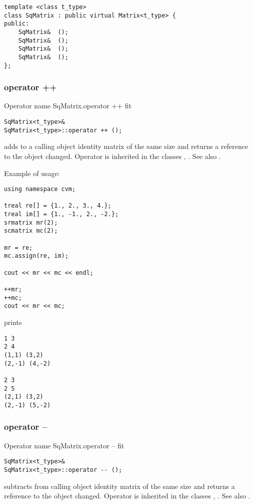 \bigskip
\noindent
\verb"template <class t_type>"\\
\verb"class SqMatrix : public virtual Matrix<t_type> {"\\
\verb"public:"\\
\verb"    SqMatrix& "\verb" ();"\\
\verb"    SqMatrix& "\verb" ();"\\
\verb"    SqMatrix& "\verb" ();"\\
\verb"    SqMatrix& "\verb" ();"\\
\verb"};"
\newpage




\subsubsection{operator ++}
Operator%
\pdfdest name {SqMatrix.operator ++} fit
\begin{verbatim}
SqMatrix<t_type>&
SqMatrix<t_type>::operator ++ ();
\end{verbatim}
adds to a calling object identity matrix of the same size
and returns a reference to
the object changed.
Operator is inherited in the classes
, .
See also .

Example of usage:
\begin{verbatim}
using namespace cvm;

treal re[] = {1., 2., 3., 4.};
treal im[] = {1., -1., 2., -2.};
srmatrix mr(2);
scmatrix mc(2);

mr = re;
mc.assign(re, im);

cout << mr << mc << endl;

++mr;
++mc;
cout << mr << mc;
\end{verbatim}
prints
\begin{verbatim}
1 3
2 4
(1,1) (3,2)
(2,-1) (4,-2)

2 3
2 5
(2,1) (3,2)
(2,-1) (5,-2)
\end{verbatim}
\newpage



\subsubsection{operator --}
Operator%
\pdfdest name {SqMatrix.operator --} fit
\begin{verbatim}
SqMatrix<t_type>&
SqMatrix<t_type>::operator -- ();
\end{verbatim}
subtracts from  calling object identity matrix of the same size
and returns a reference to
the object changed.
Operator is inherited in the classes
, .
See also .

